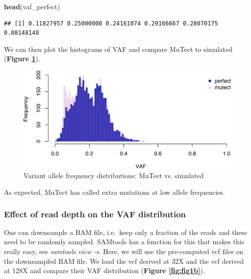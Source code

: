 \documentclass[]{article}
\newenvironment{Shaded}{\begin{snugshade}}{\end{snugshade}}
\newcommand{\KeywordTok}[1]{\textcolor[rgb]{0.13,0.29,0.53}{\textbf{#1}}}
\newcommand{\NormalTok}[1]{#1}
\begin{document}
\begin{Shaded}
\begin{Highlighting}[]
\KeywordTok{head}\NormalTok{(vaf_perfect)}
\end{Highlighting}
\end{Shaded}

\begin{verbatim}
## [1] 0.11827957 0.25000000 0.24161074 0.29166667 0.28070175 0.08148148
\end{verbatim}

We can then plot the histograms of VAF and compare MuTect to simulated
(\textbf{Figure \ref{fig:fig1}}).

\begin{figure}

{\centering \includegraphics{src_guide_files/figure-latex/fig1-1} 

}

\caption{\label{fig1}Variant allele frequency distributions: MuTect vs. simulated}\label{fig:fig1}
\end{figure}

As expected, MuTect has called extra mutations at low allele
frequencies.

\hypertarget{effect-of-read-depth-on-the-vaf-distribution}{%
\subsubsection{Effect of read depth on the VAF
distribution}\label{effect-of-read-depth-on-the-vaf-distribution}}

One can downsample a BAM file, i.e.~keep only a fraction of the reads
and these need to be randomly sampled. SAMtools has a function for this
that makes this really easy, see \emph{samtools view -s}. Here, we will
use the pre-computed vcf files on the downsampled BAM file. We load the
vcf derived at 32X and the vcf derived at 128X and compare their VAF
distribution (\textbf{Figure \ref{fig:fig1b}}).
\end{document}
